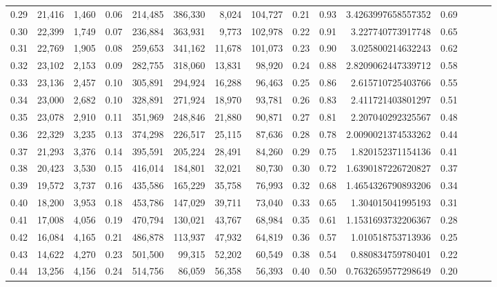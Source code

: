 \begin{tabular}{rrrrrrrrrrrrrrr}
0.29 &  21,416 &  1,460 &  0.06 &  214,485 &  386,330 &    8,024 &  104,727 &  0.21 &  0.93 &      3.4263997658557352 &      0.69 \\
0.30 &  22,399 &  1,749 &  0.07 &  236,884 &  363,931 &    9,773 &  102,978 &  0.22 &  0.91 &       3.227740773917748 &      0.65 \\
0.31 &  22,769 &  1,905 &  0.08 &  259,653 &  341,162 &   11,678 &  101,073 &  0.23 &  0.90 &       3.025800214632243 &      0.62 \\
0.32 &  23,102 &  2,153 &  0.09 &  282,755 &  318,060 &   13,831 &   98,920 &  0.24 &  0.88 &      2.8209062447339712 &      0.58 \\
0.33 &  23,136 &  2,457 &  0.10 &  305,891 &  294,924 &   16,288 &   96,463 &  0.25 &  0.86 &       2.615710725403766 &      0.55 \\
0.34 &  23,000 &  2,682 &  0.10 &  328,891 &  271,924 &   18,970 &   93,781 &  0.26 &  0.83 &       2.411721403801297 &      0.51 \\
0.35 &  23,078 &  2,910 &  0.11 &  351,969 &  248,846 &   21,880 &   90,871 &  0.27 &  0.81 &       2.207040292325567 &      0.48 \\
0.36 &  22,329 &  3,235 &  0.13 &  374,298 &  226,517 &   25,115 &   87,636 &  0.28 &  0.78 &      2.0090021374533262 &      0.44 \\
0.37 &  21,293 &  3,376 &  0.14 &  395,591 &  205,224 &   28,491 &   84,260 &  0.29 &  0.75 &       1.820152371154136 &      0.41 \\
0.38 &  20,423 &  3,530 &  0.15 &  416,014 &  184,801 &   32,021 &   80,730 &  0.30 &  0.72 &      1.6390187226720827 &      0.37 \\
0.39 &  19,572 &  3,737 &  0.16 &  435,586 &  165,229 &   35,758 &   76,993 &  0.32 &  0.68 &      1.4654326790893206 &      0.34 \\
0.40 &  18,200 &  3,953 &  0.18 &  453,786 &  147,029 &   39,711 &   73,040 &  0.33 &  0.65 &       1.304015041995193 &      0.31 \\
0.41 &  17,008 &  4,056 &  0.19 &  470,794 &  130,021 &   43,767 &   68,984 &  0.35 &  0.61 &      1.1531693732206367 &      0.28 \\
0.42 &  16,084 &  4,165 &  0.21 &  486,878 &  113,937 &   47,932 &   64,819 &  0.36 &  0.57 &       1.010518753713936 &      0.25 \\
0.43 &  14,622 &  4,270 &  0.23 &  501,500 &   99,315 &   52,202 &   60,549 &  0.38 &  0.54 &       0.880834759780401 &      0.22 \\
0.44 &  13,256 &  4,156 &  0.24 &  514,756 &   86,059 &   56,358 &   56,393 &  0.40 &  0.50 &      0.7632659577298649 &      0.20 \\

\end{tabular}
